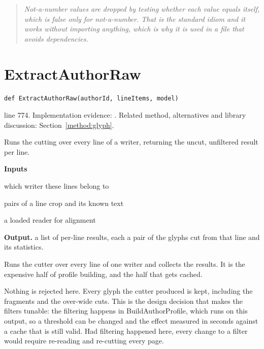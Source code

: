\begin{quote}\small\itshape Not-a-number values are dropped by testing whether each value equals itself, which is false only for not-a-number. That is the standard idiom and it works without importing anything, which is why it is used in a file that avoids dependencies.\end{quote}


\section{ExtractAuthorRaw}\label{fn:style:ExtractAuthorRaw}
\begin{lstlisting}[style=sig]
def ExtractAuthorRaw(authorId, lineItems, model)
\end{lstlisting}
 line 774. Implementation evidence: \cite{code2026}. Related method, alternatives and library discussion: Section~\ref{method:glyph}.


Runs the cutting over every line of a writer, returning the uncut, unfiltered result per line.




\noindent\textbf{Inputs}
\begin{description}[leftmargin=2.2em,style=nextline,font=\normalfont\ttfamily]\setlength\itemsep{1pt}
  \item[{authorId}] \normalfont which writer these lines belong to
  \item[{lineItems}] \normalfont pairs of a line crop and its known text
  \item[{model}] \normalfont a loaded reader for alignment
\end{description}

\noindent\textbf{Output.} a list of per-line results, each a pair of the glyphs cut from that line and its statistics.


Runs the cutter over every line of one writer and collects the results. It is the expensive half of profile building, and the half that gets cached.


Nothing is rejected here. Every glyph the cutter produced is kept, including the fragments and the over-wide cuts. This is the design decision that makes the filters tunable: the filtering happens in BuildAuthorProfile, which runs on this output, so a threshold can be changed and the effect measured in seconds against a cache that is still valid. Had filtering happened here, every change to a filter would require re-reading and re-cutting every page.

